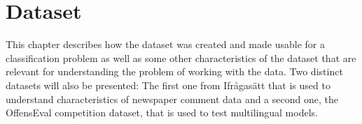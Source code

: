 \documentclass[nofilelist]{cslthse-msc}
\begin{document}




\chapter{Dataset}

This chapter describes how the dataset was created and made usable for a classification problem as well as some other characteristics of the dataset that are relevant for understanding the problem of working with the data. Two distinct datasets will also be presented: The first one from Ifrågasätt that is used to understand characteristics of newspaper comment data and a second one, the OffensEval competition dataset, that is used to test multilingual models.
\end{document}
